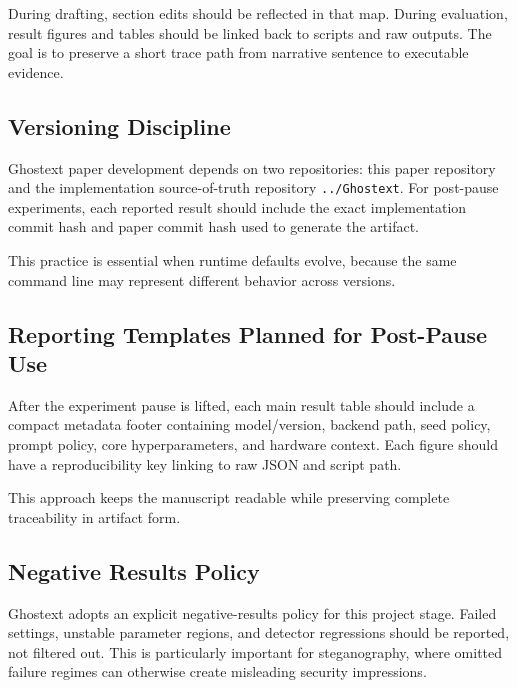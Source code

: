 During drafting, section edits should be reflected in that map. During evaluation, result figures and tables should be linked back to scripts and raw outputs. The goal is to preserve a short trace path from narrative sentence to executable evidence.

\subsection{Versioning Discipline}

Ghostext paper development depends on two repositories: this paper repository and the implementation source-of-truth repository \texttt{../Ghostext}. For post-pause experiments, each reported result should include the exact implementation commit hash and paper commit hash used to generate the artifact.

This practice is essential when runtime defaults evolve, because the same command line may represent different behavior across versions.

\subsection{Reporting Templates Planned for Post-Pause Use}

After the experiment pause is lifted, each main result table should include a compact metadata footer containing model/version, backend path, seed policy, prompt policy, core hyperparameters, and hardware context. Each figure should have a reproducibility key linking to raw JSON and script path.

This approach keeps the manuscript readable while preserving complete traceability in artifact form.

\subsection{Negative Results Policy}

Ghostext adopts an explicit negative-results policy for this project stage. Failed settings, unstable parameter regions, and detector regressions should be reported, not filtered out. This is particularly important for steganography, where omitted failure regimes can otherwise create misleading security impressions.
